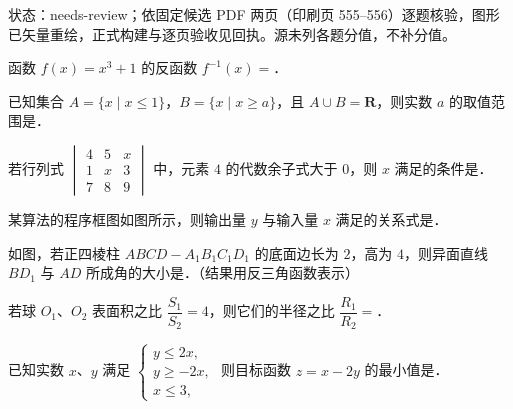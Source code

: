 

状态：needs-review；依固定候选 PDF 两页（印刷页 555–556）逐题核验，图形已矢量重绘，正式构建与逐页验收见回执。源未列各题分值，不补分值。


\begin{question}
函数 $f(x)=x^3+1$ 的反函数 $f^{-1}(x)=$\gkblank{}．

\end{question}
\begin{question}
已知集合 $A=\{x\mid x\leqslant1\}$，$B=\{x\mid x\geqslant a\}$，且 $A\cup B=\mathbf R$，则实数 $a$ 的取值范围是\gkblank{}．

\end{question}
\begin{question}
若行列式 $\begin{vmatrix}4&5&x\\1&x&3\\7&8&9\end{vmatrix}$ 中，元素 $4$ 的代数余子式大于 $0$，则 $x$ 满足的条件是\gkblank{}．

\Needspace{0.4\textheight}
\end{question}
\begin{question}
某算法的程序框图如图所示，则输出量 $y$ 与输入量 $x$ 满足的关系式是\gkblank{}．
\nopagebreak[4]
\begin{center}\end{center}
\nopagebreak[4]
\Needspace{0.4\textheight}
\end{question}
\begin{question}
如图，若正四棱柱 $ABCD-A_1B_1C_1D_1$ 的底面边长为 $2$，高为 $4$，则异面直线 $BD_1$ 与 $AD$ 所成角的大小是\gkblank{}．（结果用反三角函数表示）
\nopagebreak[4]
\begin{center}\end{center}
\nopagebreak[4]
\end{question}
\begin{question}
若球 $O_1$、$O_2$ 表面积之比 $\dfrac{S_1}{S_2}=4$，则它们的半径之比 $\dfrac{R_1}{R_2}=$\gkblank{}．

\end{question}
\begin{question}
已知实数 $x$、$y$ 满足 $\begin{cases}y\leqslant2x,\\ y\geqslant-2x,\\ x\leqslant3,\end{cases}$ 则目标函数 $z=x-2y$ 的最小值是\gkblank{}．

\end{question}

